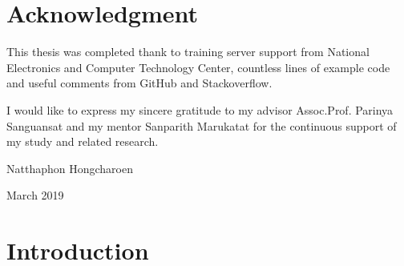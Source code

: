 \documentclass[12pt,a4paper]{report}
\begin{document}
\chapter*{Acknowledgment}
{
\hspace{0.6cm}This thesis was completed thank to training server support from National Electronics and Computer Technology Center, countless lines of example code and useful comments from GitHub and Stackoverflow.\par
I would like to express my sincere gratitude to my advisor Assoc.Prof. Parinya Sanguansat and my mentor Sanparith Marukatat for the continuous support of my study and related research. \par
\begin{flushright} 
Natthaphon Hongcharoen\par
March 2019
\end{flushright}
}
\clearpage

\tableofcontents\thispagestyle{fancy}
\clearpage

\listoffigures\thispagestyle{fancy}

\listoftables\thispagestyle{fancy}

\clearpage %

\setcounter{page}{1}
\setcounter{secnumdepth}{1}

\chapter{Introduction}\thispagestyle{fancy}
\setcounter{secnumdepth}{2}
\end{document}
